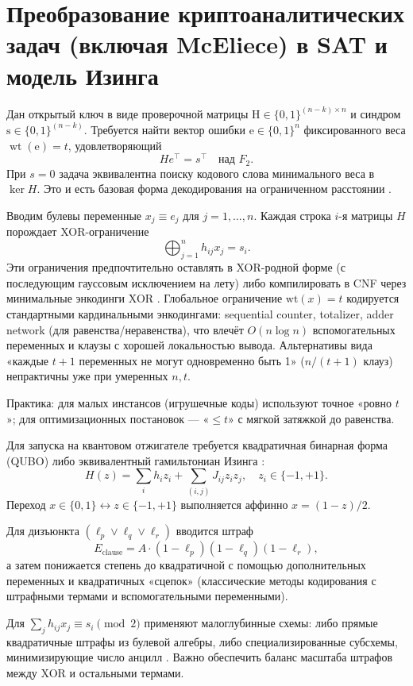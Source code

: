 
\section{Преобразование криптоаналитических задач (включая McEliece) в SAT и модель Изинга}
Дан открытый ключ в виде проверочной матрицы $\mathrm{H} \in\{0,1\}^{(n-k) \times n}$ и синдром $\mathrm{s} \in\{0,1\}^{(n-k)}$. Требуется найти вектор ошибки $\mathrm{e} \in\{0,1\}^{n}$ фиксированного веса $\operatorname{wt}(\mathrm{e})=t$, удовлетворяющий
$$
He^{\top}=s^{\top} \quad \text{над } F_2.
$$
При $s=0$ задача эквивалентна поиску кодового слова минимального веса в $\ker H$. Это и есть базовая форма декодирования на ограниченном расстоянии \cite{ClassicMcEliece2020}.

Вводим булевы переменные $x_j \equiv e_j$ для $j=1,\ldots,n$. Каждая строка $i$-я матрицы $H$ порождает XOR-ограничение
$$
\bigoplus_{j=1}^{n} h_{ij} x_j = s_i .
$$
Эти ограничения предпочтительно оставлять в XOR-родной форме (с последующим гауссовым исключением на лету) либо компилировать в CNF через минимальные энкодинги XOR \cite{Zhang2000,Lafitte2014,Im2025}. Глобальное ограничение $\mathrm{wt}(x)=t$ кодируется стандартными кардинальными энкодингами: sequential counter, totalizer, adder network (для равенства/неравенства), что влечёт $O(n \log n)$ вспомогательных переменных и клаузы с хорошей локальностью вывода. Альтернативы вида «каждые $t+1$ переменных не могут одновременно быть 1» ($n/(t+1)$ клауз) непрактичны уже при умеренных $n,t$.

Практика: для малых инстансов (игрушечные коды) используют точное «ровно $t$»; для оптимизационных постановок — «$\leq t$» с мягкой затяжкой до равенства.

Для запуска на квантовом отжигателе требуется квадратичная бинарная форма (QUBO) либо эквивалентный гамильтониан Изинга \cite{Bian2018,Sirdey2023,Pei2025}:
$$
H(z)=\sum_i h_i z_i + \sum_{(i,j)} J_{ij} z_i z_j, \quad z_i \in \{-1,+1\}.
$$
Переход $x \in \{0,1\} \leftrightarrow z \in \{-1,+1\}$ выполняется аффинно $x=(1-z)/2$.  

Для дизъюнкта $(\ell_p \vee \ell_q \vee \ell_r)$ вводится штраф
$$
E_{\text{clause}} = A \cdot (1-\ell_p)(1-\ell_q)(1-\ell_r),
$$
а затем понижается степень до квадратичной с помощью дополнительных переменных и квадратичных «сцепок» (классические методы кодирования с штрафными термами и вспомогательными переменными).

Для $\sum_j h_{ij} x_j \equiv s_i \pmod 2$ применяют малоглубинные схемы: либо прямые квадратичные штрафы из булевой алгебры, либо специализированные субсхемы, минимизирующие число анцилл \cite{Im2025}. Важно обеспечить баланс масштаба штрафов между XOR и остальными термами.

